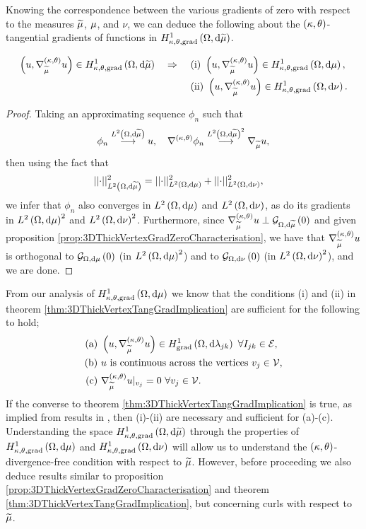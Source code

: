 Knowing the correspondence between the various gradients of zero with respect to the measures $\widetilde{\mu}$, $\mu$, and $\nu$, we can deduce the following about the $\left( \kappa, \theta \right)$-tangential gradients of functions in $H^1_{\kappa,\theta,\mathrm{grad}}\left( \Omega, \mathrm{d}\widetilde{\mu} \right)$.
\begin{theorem} \label{thm:3DThickVertexTangGradImplication}
	\begin{align*}
		\left( u, \nabla^{\left( \kappa, \theta \right)}_{\widetilde{\mu}}u \right)\in H^1_{\kappa,\theta,\mathrm{grad}}\left( \Omega, \mathrm{d}\widetilde{\mu} \right) \quad\Rightarrow\quad
		& \ \mathrm{(i)} \ \left( u, \nabla^{\left( \kappa, \theta \right)}_{\widetilde{\mu}}u \right)\in H^1_{\kappa,\theta,\mathrm{grad}}\left( \Omega, \mathrm{d}\mu \right), \\
		& \ \mathrm{(ii)} \ \left( u, \nabla^{\left( \kappa, \theta \right)}_{\widetilde{\mu}}u \right)\in H^1_{\kappa,\theta,\mathrm{grad}}\left( \Omega, \mathrm{d}\nu \right). \\
	\end{align*}
\end{theorem}
\begin{proof}
	Taking an approximating sequence $\phi_n$ such that
	\begin{align*}
		\phi_n \overset{L^{2}\left( \Omega,\mathrm{d}\widetilde{\mu} \right)}{\longrightarrow} u, \quad \nabla^{\left( \kappa, \theta \right)}\phi_n\overset{L^{2}\left( \Omega,\mathrm{d}\widetilde{\mu} \right)^2}{\longrightarrow}\nabla_{\widetilde{\mu}}u,
	\end{align*}
	then using the fact that
	\begin{align*}
		\lvert\lvert \cdot \rvert\rvert_{L^{2}\left( \Omega,\mathrm{d}\widetilde{\mu} \right)}^2 &= \lvert\lvert \cdot \rvert\rvert_{L^{2}\left( \Omega,\mathrm{d}\mu \right)}^2 + \lvert\lvert \cdot \rvert\rvert_{L^{2}\left( \Omega,\mathrm{d}\nu \right)}^2,
	\end{align*}
	we infer that $\phi_n$ also converges in $L^{2}\left( \Omega,\mathrm{d}\mu \right)$ and $L^{2}\left( \Omega,\mathrm{d}\nu \right)$, as do its gradients in $L^{2}\left( \Omega,\mathrm{d}\mu \right)^2$ and $L^{2}\left( \Omega,\mathrm{d}\nu \right)^2$.
	Furthermore, since $\nabla^{\left( \kappa, \theta \right)}_{\widetilde{\mu}}u \perp \mathcal{G}_{ \Omega, \mathrm{d}\widetilde{\mu}}\left( 0 \right)$ and given proposition \ref{prop:3DThickVertexGradZeroCharacterisation}, we have that $\nabla^{\left( \kappa, \theta \right)}_{\widetilde{\mu}}u$ is orthogonal to $\mathcal{G}_{ \Omega, \mathrm{d}\mu}\left( 0 \right)$ (in $L^{2}\left( \Omega,\mathrm{d}\mu \right)^2$) and to $\mathcal{G}_{ \Omega, \mathrm{d}\nu}\left( 0 \right)$ (in $L^{2}\left( \Omega,\mathrm{d}\nu \right)^2$), and we are done. 
\end{proof}
From our analysis of $H^1_{\kappa,\theta,\mathrm{grad}}\left( \Omega, \mathrm{d}\mu \right)$ we know that the conditions (i) and (ii) in theorem \ref{thm:3DThickVertexTangGradImplication} are sufficient for the following to hold;
\begin{align*}
		\text{(a)} \ & \bracs{u, \ktgrad_{\dddmes}u}\in\gradSob{\ddom}{\lambda_{jk}} \ \forall I_{jk}\in\edgeSet, \\
		\text{(b)} \ & u \text{ is continuous across the vertices} \ v_j\in\vertSet, \\
		\text{(c)} \ & \ktgrad_{\dddmes}u\vert_{v_j} = 0 \ \forall v_j\in\vertSet.
\end{align*}
If the converse to theorem \ref{thm:3DThickVertexTangGradImplication} is true, as implied from results in \cite{zhikov2002homogenization}, then (i)-(ii) are necessary and sufficient for (a)-(c).
Understanding the space $H^1_{\kappa,\theta,\mathrm{grad}}\left( \Omega, \mathrm{d}\widetilde{\mu} \right)$ through the properties of $H^1_{\kappa,\theta,\mathrm{grad}}\left( \Omega, \mathrm{d}\mu \right)$ and $H^1_{\kappa,\theta,\mathrm{grad}}\left( \Omega, \mathrm{d}\nu \right)$ will allow us to understand the $\left( \kappa, \theta \right)$-divergence-free condition with respect to $\widetilde{\mu}$.
However, before proceeding we also deduce results similar to proposition \ref{prop:3DThickVertexGradZeroCharacterisation} and theorem \ref{thm:3DThickVertexTangGradImplication}, but concerning curls with respect to $\widetilde{\mu}$.


